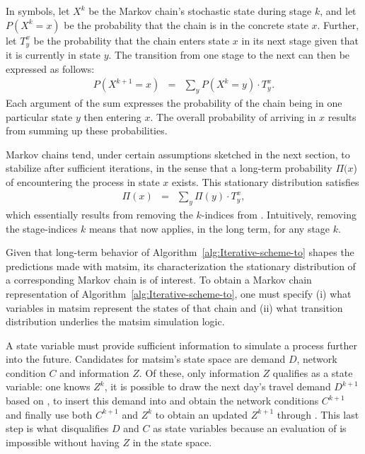 In symbols, let $X^{k}$ be the Markov chain's stochastic state during stage $k$,
and let $P(X^{k}=x)$ be the probability that  the chain is in the
concrete state $x$. Further, let $T_{y}^{x}$ be the probability that the chain
enters state $x$ in its next stage\corr{,}{} given that it is currently in state
$y$.
The transition from one stage to the next can then be expressed as follows:
\begin{eqnarray}
P(X^{k+1}=x) & = & \sum_{y}P(X^{k}=y)\cdot T_{y}^{x}.\label{eq:one-mc-transition}
\end{eqnarray}
Each argument of the sum expresses the probability of the chain being
in one particular state $y$ then entering $x$. The overall
probability of arriving in $x$ results from summing up these probabilities.

Markov chains tend, under certain assumptions sketched in
the next section, to stabilize after sufficient iterations,
in the sense that a long-term probability $\Pi(x$) of
encountering the process in state $x$ exists. This stationary distribution
satisfies
\begin{eqnarray}
\Pi(x) & = & \sum_{y}\Pi(y)\cdot T_{y}^{x},\label{eq:mc-stationary}
\end{eqnarray}
which essentially results from removing the $k$-indices from .
Intuitively, removing the stage-indices $k$ means that 
now applies, in the long term, for any stage $k$.

Given that  long-term behavior of
Algorithm~\ref{alg:Iterative-scheme-to} shapes the predictions made with
\gls{matsim}, its characterization  the stationary
distribution of a corresponding Markov chain is of interest. To obtain a Markov chain
representation of Algorithm~\ref{alg:Iterative-scheme-to}, one must specify (i)
what variables in \gls{matsim} represent the states of that chain and (ii) what
transition distribution underlies the \gls{matsim} simulation logic.

A state variable must provide sufficient information to simulate a process
further into the future. Candidates for \gls{matsim}'s state space
are demand $D$,  network condition $C$ and 
information $Z$. Of these, only  information $Z$ qualifies as a
state variable:
 one knows $Z^{k}$, it is possible to draw the next day's travel
demand $D^{k+1}$\corr{,}{} based on , to insert this demand
into  and obtain the network conditions
$C^{k+1}$ and  finally use both $C^{k+1}$ and $Z^{k}$ to obtain an
updated $Z^{k+1}$ through .
This last step is what disqualifies $D$ and $C$ as state variables\corr{,}{}
because an evaluation of  is impossible without having $Z$ in
the state space.

